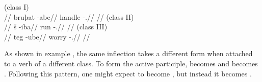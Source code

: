 	\begingl
		\glpreamble{} (class I)\\
		//
		\gla bruþat -abe//
		\glb handle -\Act.\Ptcp//
		\glft {}//
	\endgl
	\a<cl2>\begingl
		\glpreamble{} (class II)\\
		//
		\gla š -iba//
		\glb run -\Act.\Ptcp//
		\glft {}//
	\endgl
	\a<cl3>\begingl
		\glpreamble{} (class III)\\
		//
		\gla teg -ube//
		\glb worry -\Act.\Ptcp//
		\glft {}//
	\endgl
\xe

As shown in example , the same inflection takes a different form when attached to a verb of a different class. To form the active participle,  becomes  and  becomes . Following this pattern, one might expect  to become \ungr{}, but instead it becomes .



